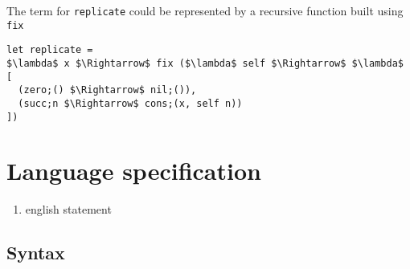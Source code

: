 \documentclass[manuscript]{acmart}
\begin{document}
\noindent The term for \lstinline{replicate} could be represented by a recursive function built using \lstinline{fix} 

\begin{lstlisting}[]
let replicate = 
$\lambda$ x $\Rightarrow$ fix ($\lambda$ self $\Rightarrow$ $\lambda$ [
  (zero;() $\Rightarrow$ nil;()),
  (succ;n $\Rightarrow$ cons;(x, self n))
]) 
\end{lstlisting}


\section{Language specification}
\begin{enumerate}
  \item english statement 
\end{enumerate}
\subsection{Syntax}
\end{document}
